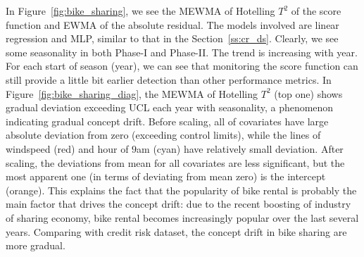 \documentclass[twoside,11pt]{article}
\begin{document}
In Figure~\ref{fig:bike_sharing}, we see the MEWMA of Hotelling $T^2$ of the score function and EWMA of the absolute residual. The models involved are linear regression and MLP, similar to that in the Section~\ref{ss:cr_ds}. Clearly, we see some seasonality in both Phase-I and Phase-II. The trend is increasing with year. For each start of season (year), we can see that monitoring the score function can still provide a little bit earlier detection than other performance metrics. In Figure~\ref{fig:bike_sharing_diag}, the MEWMA of Hotelling $T^2$ (top one) shows gradual deviation exceeding UCL each year with seasonality, a phenomenon indicating gradual concept drift. Before scaling, all of covariates have large absolute deviation from zero (exceeding control limits), while the lines of windspeed (red) and hour of $9$am (cyan) have relatively small deviation. After scaling, the deviations from mean for all covariates are less significant, but the most apparent one (in terms of deviating from mean zero) is the intercept (orange). This explains the fact that the popularity of bike rental is probably the main factor that drives the concept drift: due to the recent boosting of industry of sharing economy, bike rental becomes increasingly popular over the last several years. Comparing with credit risk dataset, the concept drift in bike sharing are more gradual. 
\end{document}
